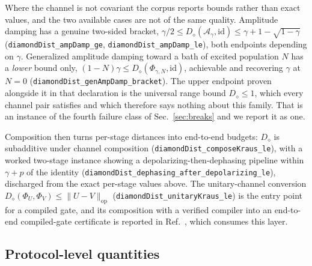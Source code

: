 \documentclass[aps,pra,reprint,nofootinbib,superscriptaddress]{revtex4-2}
\theoremstyle{plain}
\theoremstyle{definition}
\theoremstyle{remark}
\newcommand{\lean}[1]{\texttt{#1}}
\newcommand{\ddist}{D_{\diamond}}
\begin{document}
\begin{table}
\caption{Exact diamond distances to the identity, closed by an explicit
dual witness. Every row is an equality, not a bound. The last two rows
are the non-covariant cases, where equality is not available and the
entry is what is proven.}
\label{tab:exact}
\begin{ruledtabular}
\footnotesize

\end{ruledtabular}
\end{table}

Where the channel is not covariant the corpus reports bounds rather than
exact values, and the two available cases are not of the same quality.
Amplitude damping has a genuine two-sided bracket,
$\gamma/2 \le \ddist(\mathcal A_\gamma,\mathrm{id}) \le
\gamma + 1 - \sqrt{1-\gamma}$ (\lean{diamondDist\_ampDamp\_ge},
\lean{diamondDist\_ampDamp\_le}), both endpoints depending on $\gamma$.
Generalized amplitude damping toward a bath of excited population $N$ has
a \emph{lower} bound only, $(1-N)\gamma \le
\ddist(\Phi_{\gamma,N},\mathrm{id})$, achievable and recovering $\gamma$
at $N=0$ (\lean{diamondDist\_genAmpDamp\_bracket}). The upper endpoint
proven alongside it in that declaration is the universal range bound
$\ddist \le 1$, which every channel pair satisfies and which therefore
says nothing about this family. That is an instance of the fourth failure
class of Sec.~\ref{sec:breaks} and we report it as one.

Composition then turns per-stage distances into end-to-end budgets:
$\ddist$ is subadditive under channel composition
(\lean{diamondDist\_composeKraus\_le}), with a worked two-stage instance
showing a depolarizing-then-dephasing pipeline within $\gamma+p$ of the
identity (\lean{diamondDist\_dephasing\_after\_depolarizing\_le}),
discharged from the exact per-stage values above. The unitary-channel
conversion $\ddist(\Phi_U,\Phi_V) \le \lVert U-V\rVert_{\mathrm{op}}$
(\lean{diamondDist\_unitaryKraus\_le}) is the entry point for a compiled
gate, and its composition with a verified compiler into an end-to-end
compiled-gate certificate is reported in
Ref.~\cite{CompanionCompilation}, which consumes this layer.

\subsection{Protocol-level quantities}
\end{document}
